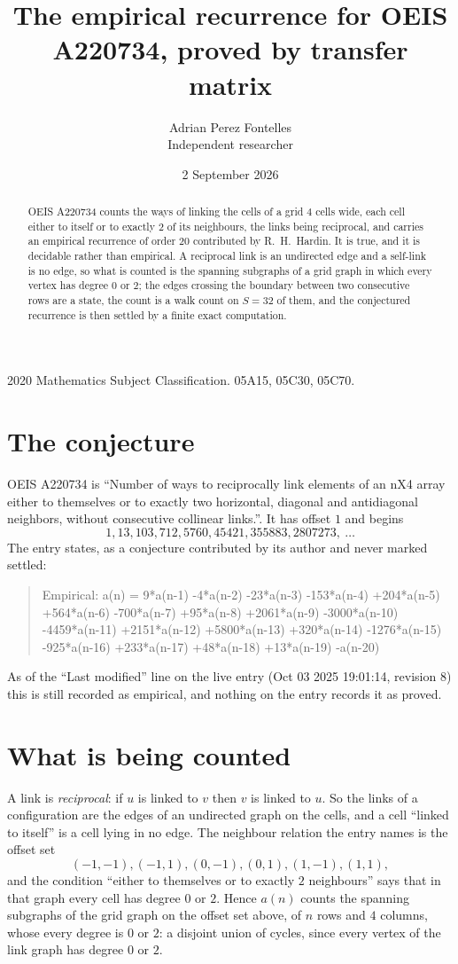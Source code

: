 \documentclass[11pt,a4paper]{article}
\title{The empirical recurrence for OEIS A220734, proved by transfer matrix}
\author{Adrian Perez Fontelles\\ \small Independent researcher}
\date{2 September 2026}
\theoremstyle{plain}
\theoremstyle{definition}
\begin{document}
\maketitle

\begin{abstract}
OEIS A220734 counts the ways of linking the cells of a grid $4$ cells wide, each cell either to
itself or to exactly $2$ of its neighbours, the links being reciprocal, and carries an
empirical recurrence of order $20$ contributed by R.~H.~Hardin. It is true, and it is
decidable rather than empirical. A reciprocal link is an undirected edge and a self-link is
no edge, so what is counted is the spanning subgraphs of a grid graph in which every vertex
has degree $0$ or $2$; the edges crossing the boundary between two consecutive rows are a
state, the count is a walk count on $S=32$ of them, and the conjectured recurrence is then
settled by a finite exact computation.
\end{abstract}

\noindent\small 2020 Mathematics Subject Classification. 05A15, 05C30, 05C70.\normalsize

\section{The conjecture}

OEIS A220734 is ``Number of ways to reciprocally link elements of an nX4 array either to themselves or to exactly two horizontal, diagonal and antidiagonal neighbors, without consecutive collinear links.''. It has offset $1$ and begins
\[
1, 13, 103, 712, 5760, 45421, 355883, 2807273,\ \dots
\]
The entry states, as a conjecture contributed by its author and never marked settled:
\begin{quote}
Empirical: a(n) = 9*a(n-1) -4*a(n-2) -23*a(n-3) -153*a(n-4) +204*a(n-5) +564*a(n-6) -700*a(n-7) +95*a(n-8) +2061*a(n-9) -3000*a(n-10) -4459*a(n-11) +2151*a(n-12) +5800*a(n-13) +320*a(n-14) -1276*a(n-15) -925*a(n-16) +233*a(n-17) +48*a(n-18) +13*a(n-19) -a(n-20)
\end{quote}
As of the ``Last modified'' line on the live entry (Oct 03 2025 19:01:14, revision 8) this is still
recorded as empirical, and nothing on the entry records it as proved.

\section{What is being counted}

A link is \emph{reciprocal}: if $u$ is linked to $v$ then $v$ is linked to $u$. So the links
of a configuration are the edges of an undirected graph on the cells, and a cell ``linked to
itself'' is a cell lying in no edge. The neighbour relation the entry names is the offset set
\[
(-1,-1), (-1,1), (0,-1), (0,1), (1,-1), (1,1),
\]
and the condition ``either to themselves or to exactly $2$ neighbours'' says that in that
graph every cell has degree $0$ or $2$. Hence $a(n)$ counts the spanning subgraphs of the
grid graph on the offset set above, of $n$ rows and $4$ columns,
whose every degree is $0$ or $2$: a disjoint union of cycles, since every vertex of the link graph has degree $0$ or $2$.
\end{document}
